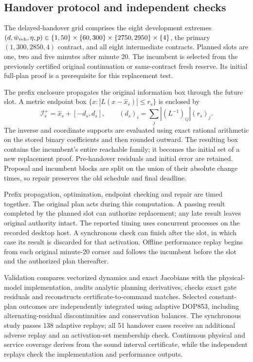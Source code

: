 \documentclass[preprint,12pt]{elsarticle}
\numberwithin{equation}{section}
\begin{document}
\subsection{Handover protocol and independent checks}
The delayed-handover grid comprises the eight development extremes
$(d,\bar w_{\rm veh},\eta,p)\in\{1,50\}\times\{60,300\}\times
\{2750,2950\}\times\{4\}$, the primary $(1,300,2850,4)$ contract,
and all eight intermediate contracts. Planned slots are one, two and
five minutes after minute 20. The incumbent is selected from the
previously certified original continuation or same-contract fresh
reserve. Its initial full-plan proof is a prerequisite for this
replacement test.

The prefix enclosure propagates the original information box through
the future slot. A metric endpoint box
$\{x:|L(x-\widehat x_s)|\le r_s\}$ is enclosed by
\begin{equation}
\mathcal I_s^+=\widehat x_s+[-d_s,d_s],\qquad
(d_s)_i=\sum_j|(L^{-1})_{ij}|(r_s)_j.
\label{eq:benchmark-handover-box}
\end{equation}
The inverse and coordinate supports are evaluated using exact rational
arithmetic on the stored binary coefficients and then rounded outward.
The resulting box contains the incumbent's entire reachable family;
it becomes the initial set of a new replacement proof. Pre-handover
residuals and initial error are retained. Proposal and incumbent blocks
are split on the union of their absolute change times, so repair
preserves the old schedule and final deadline.

Prefix propagation, optimization, endpoint checking and repair are
timed together. The original plan acts during this computation. A
passing result completed by the planned slot can authorize replacement;
any late result leaves original authority intact. The reported timing
uses concurrent processes on the recorded desktop host. A synchronous
check can finish after the slot, in which case its result is discarded
for that activation. Offline performance replay begins from each
original minute-20 corner and follows the incumbent before the slot
and the authorized plan thereafter.

Validation compares vectorized dynamics and exact Jacobians with the
physical-model implementation, audits analytic planning derivatives,
checks exact gate residuals and reconstructs certificate-to-command
matches. Selected constant-plan outcomes are independently integrated
using adaptive DOP853, including alternating-residual discontinuities
and conservation balances. The synchronous study passes 138 adaptive
replays; all 51 handover cases receive an additional adverse replay and
an activation-set membership check. Continuous physical and service
coverage derives from the sound interval certificate, while the
independent replays check the implementation and performance outputs.
\end{document}
